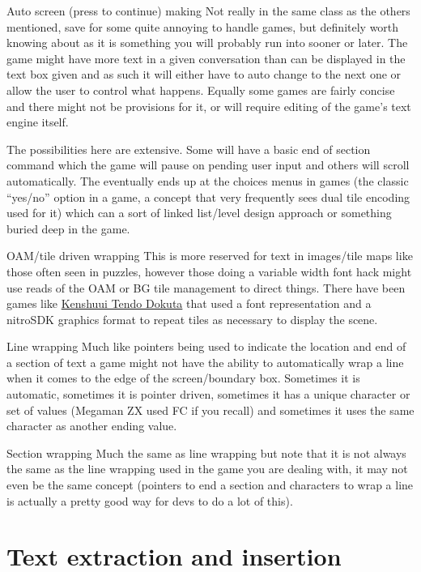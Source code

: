 \documentclass[
]{book}
\begin{document}
Auto screen (press to continue) making Not really in the same class as the others mentioned, save for some quite annoying to handle games, but definitely worth knowing about as it is something you will probably run into sooner or later. The game might have more text in a given conversation than can be displayed in the text box given and as such it will either have to auto change to the next one or allow the user to control what happens. Equally some games are fairly concise and there might not be provisions for it, or will require editing of the game's text engine itself.

The possibilities here are extensive. Some will have a basic end of section command which the game will pause on pending user input and others will scroll automatically. The eventually ends up at the choices menus in games (the classic ``yes/no'' option in a game, a concept that very frequently sees dual tile encoding used for it) which can a sort of linked list/level design approach or something buried deep in the game.

OAM/tile driven wrapping This is more reserved for text in images/tile maps like those often seen in puzzles, however those doing a variable width font hack might use reads of the OAM or BG tile management to direct things. There have been games like \href{http://gbatemp.net/topic/320192-japanese-programming-madness/}{Kenshuui Tendo Dokuta} that used a font representation and a nitroSDK graphics format to repeat tiles as necessary to display the scene.

Line wrapping Much like pointers being used to indicate the location and end of a section of text a game might not have the ability to automatically wrap a line when it comes to the edge of the screen/boundary box. Sometimes it is automatic, sometimes it is pointer driven, sometimes it has a unique character or set of values (Megaman ZX used FC if you recall) and sometimes it uses the same character as another ending value.

Section wrapping Much the same as line wrapping but note that it is not always the same as the line wrapping used in the game you are dealing with, it may not even be the same concept (pointers to end a section and characters to wrap a line is actually a pretty good way for devs to do a lot of this).

\hypertarget{text-extraction-and-insertion}{%
\section{Text extraction and insertion}\label{text-extraction-and-insertion}}
\end{document}
